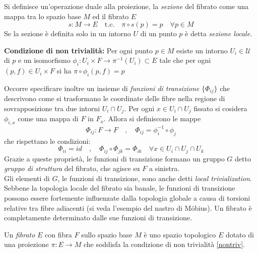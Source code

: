 Si definisce un'operazione duale alla proiezione, la \emph{sezione} del fibrato
come una mappa tra lo spazio base $M$ ed il fibrato $E$
$$
s : M \to E \quad \mathrm{t.c.}\quad \pi \circ s (p) = p \quad \forall p \in M
$$
Se la sezione è definita solo in un intorno $U$ di un punto $p$ è detta \emph{sezione locale.}


\begin{axiom}\textbf{Condizione di non trivialità:} \label{nontriv}
      Per ogni punto $p \in M$ esiste un intorno $U_i \in \mathcal{U}$ di $p$ e un isomorfismo
      $\phi_i : U_i \times F \to \pi^{-1}(U_i) \subset E$ tale che per ogni
      $(p,f) \in U_i \times F$ si ha $\pi \circ \phi_i(p,f) = p$
\end{axiom}

Occorre specificare inoltre un insieme di \emph{funzioni di transizione} $\{\Phi_{ij}\}$ che
descrivono come si trasformano le coordinate delle fibre nella regione di
sovrapposizione tra due intorni $U_i \cap U_j$. Per ogni $x \in U_i \cap U_j$ fissato si
cosidera $\phi_{i,x}$ come una mappa di $F$ in $F_x$.
Allora si definiscono le mappe
\begin{equation}\label{eq:transfunctions}
   \Phi_{ij} : F \to F \quad , \quad \Phi_{ij} = \phi_i^{-1} \circ\phi_j
\end{equation}
che rispettano le condizioni:
\begin{equation}
   \Phi_{ii} = id \quad , \quad \Phi_{ij} \circ \Phi_{jk} = \Phi_{ik}
   \quad \forall x \in U_i \cap U_j \cap U_k
\end{equation}
Grazie a queste proprietà, le funzioni di transizione formano un gruppo $G$ detto
\emph{gruppo di struttura} del fibrato, che agisce su $F$ a sinistra.\\
Gli elementi di $G$, le funzioni di transizione, sono anche detti
\emph{local trivialization}.\\

Sebbene la topologia locale del fibrato sia banale, le funzioni di transizione
possono essere fortemente influenzate dalla topologia globale a causa di torsioni
relative tra fibre adiacenti (si veda l'esempio del nastro di Möbius). Un fibrato
è completamente determinato dalle sue funzioni di transizione.\\

\begin{definition}
   Un \emph{fibrato} $E$ con fibra $F$ sullo spazio base $M$ è uno spazio topologico
   $E$ dotato di una proiezione $\pi : E \to M$ che soddisfa la condizione di
   non trivialità \ref{nontriv}.
\end{definition}

